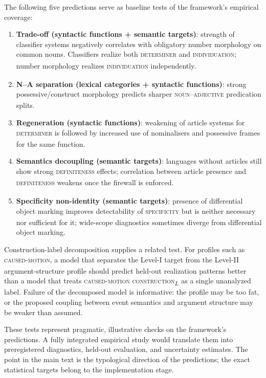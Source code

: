 \documentclass[12pt]{article}
\begin{document}
The following five predictions serve as baseline tests of the framework's empirical coverage:

\begin{enumerate}
    \item \textbf{Trade-off (syntactic functions + semantic targets)}: strength of classifier systems negatively correlates with obligatory number morphology on common nouns. Classifiers realize both \textsc{determiner}\textsubscript{\Cross} and \textsc{individuation}\textsubscript{\Cross}; number morphology realizes \textsc{individuation}\textsubscript{\Cross} independently.
    \item \textbf{N--A separation (lexical categories + syntactic functions)}: strong possessive/construct morphology predicts sharper \textsc{noun}\textsubscript{\Cross}--\textsc{adjective}\textsubscript{\Cross} predication splits.
    \item \textbf{Regeneration (syntactic functions)}: weakening of article systems for \textsc{determiner}\textsubscript{\Cross} is followed by increased use of nominalisers and possessive frames for the same function.
    \item \textbf{Semantics decoupling (semantic targets)}: languages without articles still show strong \textsc{definiteness}\textsubscript{\Cross} effects; correlation between article presence and \textsc{definiteness}\textsubscript{\Cross} weakens once the firewall is enforced.
    \item \textbf{Specificity non-identity (semantic targets)}: presence of differential object marking improves detectability of \textsc{specificity}\textsubscript{\Cross} but is neither necessary nor sufficient for it; wide-scope diagnostics sometimes diverge from differential object marking.
\end{enumerate}

Construction-label decomposition supplies a related test. For profiles such as \textsc{caused-motion}\textsubscript{\Cross}, a model that separates the Level-I target from the Level-II argument-structure profile should predict held-out realization patterns better than a model that treats \textsc{caused-motion construction}\textsubscript{$L$} as a single unanalyzed label. Failure of the decomposed model is informative: the profile may be too fat, or the proposed coupling between event semantics and argument structure may be weaker than assumed.

These tests represent pragmatic, illustrative checks on the framework's predictions. A fully integrated empirical study would translate them into preregistered diagnostics, held-out evaluation, and uncertainty estimates. The point in the main text is the typological direction of the predictions; the exact statistical targets belong to the implementation stage.
\end{document}
